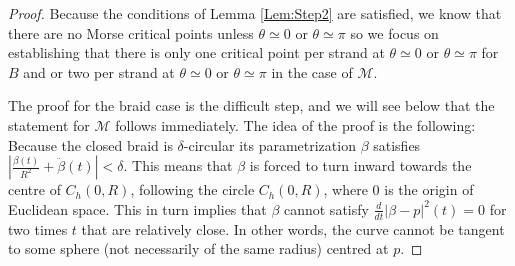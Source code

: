 \documentclass[twoside,leqno]{article}
\newcommand{\M}{\mathcal{M}}
\begin{document}
\begin{proof}%
Because the conditions of Lemma \ref{Lem:Step2} are satisfied, we know that there are no Morse critical points unless $\theta \simeq 0$ or $\theta \simeq \pi$ so we focus on establishing that there is only one critical point per strand at $\theta \simeq 0$ or $\theta \simeq \pi$ for $B$ and or two per strand at $\theta \simeq 0$ or $\theta \simeq \pi$ in the case of $\M$.

The proof for the braid case is the difficult step, and we will see below that the statement for $\M$ follows immediately. The idea of the proof is the following: Because the closed braid is $\delta$-circular its parametrization $\beta$ satisfies $\left|\frac{\beta (t)}{R^2} +  \ddot{\beta} (t)  \right| <  \delta$. This means that $\beta$ is forced to turn inward towards the centre of $C_h(0,R)$, following the circle $C_h(0,R)$, where $0$ is the origin of Euclidean space. This in turn implies that $\beta$ cannot satisfy $\frac{d}{dt} | \beta - p|^2 (t) = 0 $ for two times $t$ that are relatively close. In other words, the curve cannot be tangent to some sphere (not necessarily of the same radius) centred at $p$. 


\end{proof}
\end{document}
